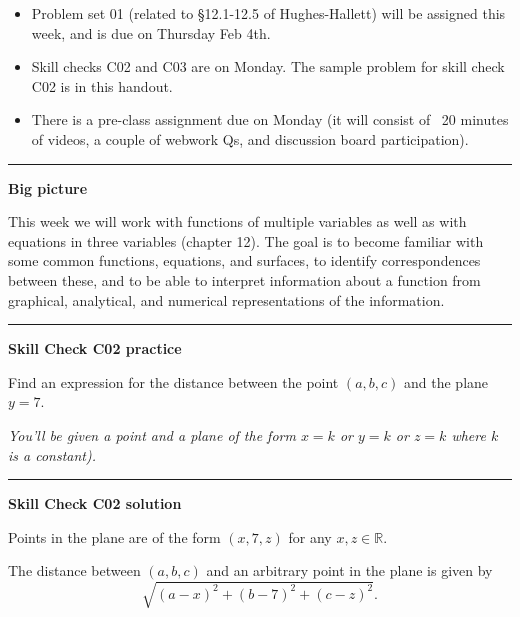\documentclass[12pt,letterpaper,noanswers]{exam}
\begin{document}
 \pdfpageheight 11in 
  \pdfpagewidth 8.5in


\begin{itemize}
    \itemsep0em
    \item Problem set 01 (related to \S 12.1-12.5 of Hughes-Hallett) will be assigned this week, and is due on Thursday Feb 4th.  
    \item Skill checks C02 and C03 are on Monday.  The sample problem for skill check C02 is in this handout.
    \item There is a pre-class assignment due on Monday (it will consist of ~20 minutes of videos, a couple of webwork Qs, and discussion board participation).
\end{itemize}

\hrule
\vspace{0.2cm}

\noindent\textbf{Big picture}

This week we will work with functions of multiple variables as well as with equations in three variables (chapter 12).  The goal is to become familiar with some common functions, equations, and surfaces, to identify correspondences between these, and to be able to interpret information about a function from graphical, analytical, and numerical representations of the information.

\vspace{0.2cm}
\hrule
\vspace{0.2cm}

\noindent\textbf{Skill Check C02 practice}
\begin{questions}
\item Find an expression for the distance between the point $(a,b,c)$ and the plane $y = 7.$

\emph{You'll be given a point and a plane of the form $x = k$ or $y = k$ or $z = k$ where $k$ is a constant).}

\end{questions}


\vspace{0.2cm}

\hrule
\vspace{0.2cm}

\noindent\textbf{Skill Check C02 solution}

Points in the plane are of the form $(x,7,z)$ for any $x,z\in \mathbb{R}$.  

The distance between $(a,b,c)$ and an arbitrary point in the plane is given by \[\sqrt{(a-x)^2 + (b-7)^2 + (c-z)^2}.\]
\end{document}

